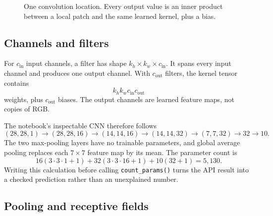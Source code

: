 \begin{figure}[htbp]
\centering
{}
\caption{One convolution location. Every output value is an inner product
between a local patch and the same learned kernel, plus a bias.}
\label{fig:convolution-mechanics}
\end{figure}

\subsection{Channels and filters}

For $c_{\mathrm{in}}$ input channels, a filter has shape
$k_h\times k_w\times c_{\mathrm{in}}$. It spans every input channel and
produces one output channel. With $c_{\mathrm{out}}$ filters, the kernel tensor
contains
\[
  k_hk_wc_{\mathrm{in}}c_{\mathrm{out}}
\]
weights, plus $c_{\mathrm{out}}$ biases. The output channels are learned feature
maps, not copies of RGB.

The notebook's inspectable CNN therefore follows
\[
 (28,28,1)\to(28,28,16)\to(14,14,16)
 \to(14,14,32)\to(7,7,32)\to32\to10.
\]
The two max-pooling layers have no trainable parameters, and global average
pooling replaces each $7\times7$ feature map by its mean. The parameter count is
\[
  16(3\cdot3\cdot1+1)
  +32(3\cdot3\cdot16+1)
  +10(32+1)
  =5{,}130.
\]
Writing this calculation before calling \texttt{count\_params()} turns the API
result into a checked prediction rather than an unexplained number.

\subsection{Pooling and receptive fields}

